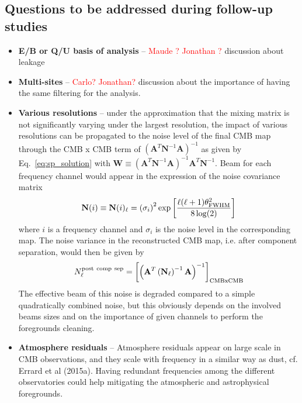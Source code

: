 \subsection{Questions to be addressed during follow-up studies}
\begin{itemize}
	\item \textbf{E/B or Q/U basis of analysis} -- \textcolor{red}{Maude ? Jonathan ?} discussion about leakage
	\item \textbf{Multi-sites} -- \textcolor{red}{Carlo? Jonathan?} discussion about the importance of having the same filtering for the analysis.
	\item \textbf{Various resolutions} -- under the approximation that the mixing matrix is not significantly varying under the largest resolution, the impact of various resolutions can be propagated to the noise level of the final CMB map through the CMB x CMB term of $\left(\mathbf{A}^T\mathbf{N}^{-1}\mathbf{A}\right)^{-1}$ as given by Eq.~\ref{eq:sp_solution} with $\mathbf{W} \equiv \left( \mathbf{A}^T\mathbf{N}^{-1}\mathbf{A} \right)^{-1}\mathbf{A}^T\mathbf{N}^{-1}$. Beam for each frequency channel would appear in the expression of the noise covariance matrix 
	\begin{eqnarray}
		\centering
			\mathbf{N}(i) \equiv \mathbf{N}(i)_\ell = \left( \sigma_i\right)^2\exp\left[ \frac{\ell(\ell+1)\theta_{\rm FWHM}^2}{8\log(2)} \right]
	\end{eqnarray}
	where $i$ is a frequency channel and $\sigma_i$ is the noise level in the corresponding map. The noise variance in the reconstructed CMB map, i.e. after component separation, would then be given by
	\begin{eqnarray}
		\centering
			N_\ell^{\rm post\ comp\ sep} = \left[\left(\mathbf{A}^T\left(\mathbf{N}_\ell\right)^{-1}\mathbf{A}\right)^{-1}\right]_{\rm CMBxCMB}
	\end{eqnarray}
	The effective beam of this noise is degraded compared to a simple quadratically combined noise, but this obviously depends on the involved beams sizes and on the importance of given channels to perform the foregrounds cleaning.
	\item \textbf{Atmosphere residuals} -- Atmosphere residuals appear on large scale in CMB observations, and they scale with frequency in a similar way as dust, cf. Errard et al (2015a). Having redundant frequencies among the different observatories could help mitigating the atmospheric and astrophysical foregrounds.
\end{itemize}




%



